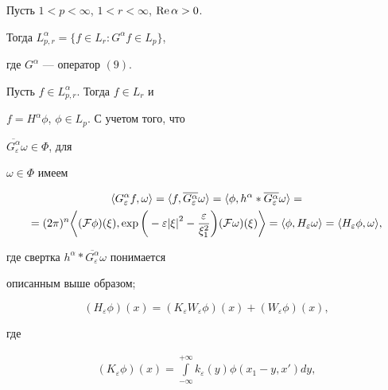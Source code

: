 \begin{thm}


Пусть $1<p<\infty$, $1<r<\infty$, $\operatorname{Re}\alpha>0$.


Тогда $L_{p,r}^{\alpha}=\{f\in L_r: G^\alpha f\in L_p\}$,


где $G^\alpha$ --- оператор $(9)$.


\end{thm}





\begin{pf}


Пусть $f\in L_{p,r}^{\alpha}$. Тогда $f\in L_r$ и


$f=H^\alpha\phi$, $\phi\in L_p$. С учетом того, что


$\overline{G_\varepsilon^\alpha}\omega\in\Phi$, для


$\omega\in\Phi$ имеем


\begin{multline}


\la G_\varepsilon^\alpha f,\omega\ra=\la f,


\overline{G_\varepsilon^\alpha}\omega\ra


=\la\phi,h^\alpha *\overline{G_\varepsilon^\alpha}\omega\ra=\\


%


=(2\pi)^n\bigg\la(\F\phi)(\xi),\exp\bigg(-\varepsilon{|\xi|}^2


-\frac{\varepsilon}


{{\xi}_1^2}\bigg)(\F\omega)(\xi)\bigg\ra=\la\phi,H_\varepsilon\omega\ra=


\la H_{\varepsilon}\phi,\omega\ra,


\end{multline}


где свертка $h^\alpha *\overline{G_\varepsilon^\alpha}\omega$ понимается


описанным выше образом;


$$


(H_\varepsilon\phi)(x)=(K_{\varepsilon}W_{\varepsilon}


\phi)(x)+(W_{\varepsilon}\phi)(x),


$$


где


\begin{gather*}


(K_{\varepsilon}\phi)(x)=\int\limits_{-\infty}^{+


\infty}k_{\varepsilon}(y)\phi(x_1-y,x')dy, \\



\end{gather*}
\end{pf}
